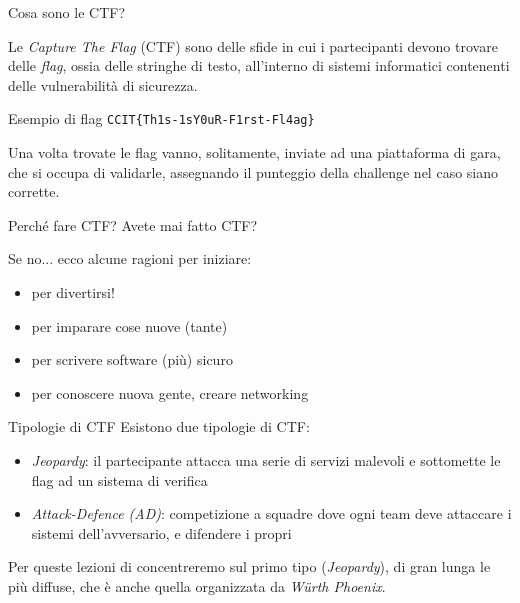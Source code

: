 \documentclass[12pt,handout]{beamer}
\begin{document}
\begin{frame}{Cosa sono le CTF?}

Le \textit{Capture The Flag} (CTF) sono delle sfide in cui i partecipanti 
devono trovare delle \textit{flag}, ossia delle stringhe di testo, all'interno
di sistemi informatici contenenti delle vulnerabilità di sicurezza. 
\vfill
\begin{exampleblock}{Esempio di flag}
\texttt{CCIT\{Th1s-1sY0uR-F1rst-Fl4ag\}}
\end{exampleblock}
\vfill
Una volta trovate le flag vanno, solitamente, inviate ad una piattaforma di gara, 
che si occupa di validarle, assegnando il punteggio della challenge nel caso siano corrette.
\end{frame}

\begin{frame}{Perché fare CTF?}
Avete mai fatto CTF?

\pause\vfill

Se no... ecco alcune ragioni per iniziare:
\pause\vfill
\begin{itemize}
\item per divertirsi!
\pause\vfill
\item per imparare cose nuove (tante)
\pause\vfill
\item per scrivere software (più) sicuro
\pause\vfill
\item per conoscere nuova gente, creare networking
\end{itemize}
\end{frame}

\begin{frame}{Tipologie di CTF}
Esistono due tipologie di CTF:
\begin{itemize}
    \item \textit{Jeopardy}: il partecipante attacca una serie di servizi malevoli e sottomette le flag ad un sistema di verifica
    \item \textit{Attack-Defence (AD)}: competizione a squadre dove ogni team deve attaccare i sistemi dell'avversario, e difendere i propri
\end{itemize}

\vfill
Per queste lezioni di concentreremo sul primo tipo (\textit{Jeopardy}), di gran lunga le più diffuse, che è anche
quella organizzata da \textit{Würth Phoenix}.
\end{frame}
\end{document}
